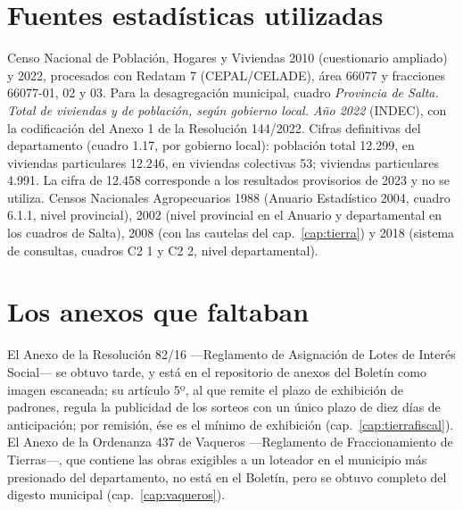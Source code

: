 \section*{Fuentes estadísticas utilizadas}

Censo Nacional de Población, Hogares y Viviendas 2010 (cuestionario ampliado) y 2022, procesados con Redatam 7 (CEPAL/CELADE), área 66077 y fracciones 66077-01, 02 y 03. Para la desagregación municipal, cuadro \textit{Provincia de Salta. Total de viviendas y de población, según gobierno local. Año 2022} (INDEC), con la codificación del Anexo 1 de la Resolución 144/2022. Cifras definitivas del departamento (cuadro 1.17, por gobierno local): población total 12.299, en viviendas particulares 12.246, en viviendas colectivas 53; viviendas particulares 4.991. La cifra de 12.458 corresponde a los resultados provisorios de 2023 y no se utiliza. Censos Nacionales Agropecuarios 1988 (Anuario Estadístico 2004, cuadro 6.1.1, nivel provincial), 2002 (nivel provincial en el Anuario y departamental en los cuadros de Salta), 2008 (con las cautelas del cap.\ \ref{cap:tierra}) y 2018 (sistema de consultas, cuadros C2 1 y C2 2, nivel departamental).

\section*{Los anexos que faltaban}

\begin{cautela}
El Anexo de la Resolución 82/16 ---Reglamento de Asignación de Lotes de Interés Social--- se obtuvo tarde, y está en el repositorio de anexos del Boletín como imagen escaneada; su artículo 5º, al que remite el plazo de exhibición de padrones, regula la publicidad de los sorteos con un único plazo de diez días de anticipación; por remisión, ése es el mínimo de exhibición (cap.\ \ref{cap:tierrafiscal}). El Anexo de la Ordenanza 437 de Vaqueros ---Reglamento de Fraccionamiento de Tierras---, que contiene las obras exigibles a un loteador en el municipio más presionado del departamento, no está en el Boletín, pero se obtuvo completo del digesto municipal (cap.\ \ref{cap:vaqueros}).
\end{cautela}
